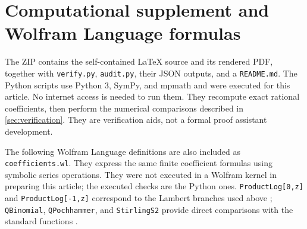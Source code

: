 \documentclass[11pt,a4paper]{article}
\theoremstyle{definition}
\theoremstyle{remark}
\numberwithin{equation}{section}
\begin{document}
\section{Computational supplement and Wolfram Language formulas}
\label{app:code}
The ZIP contains the self-contained \LaTeX{} source and its rendered PDF, together with \texttt{verify.py}, \texttt{audit.py}, their JSON outputs, and a \texttt{README.md}. The Python scripts use Python 3, SymPy, and mpmath and were executed for this article. No internet access is needed to run them. They recompute exact rational coefficients, then perform the numerical comparisons described in \cref{sec:verification}. They are verification aids, not a formal proof assistant development.

The following Wolfram Language definitions are also included as \texttt{coefficients.wl}. They express the same finite coefficient formulas using symbolic series operations. They were not executed in a Wolfram kernel in preparing this article; the executed checks are the Python ones. \texttt{ProductLog[0,z]} and \texttt{ProductLog[-1,z]} correspond to the Lambert branches used above \cite{wlproductlog}; \texttt{QBinomial}, \texttt{QPochhammer}, and \texttt{StirlingS2} provide direct comparisons with the standard functions \cite{wlqbinomial,wlqpochhammer,wlstirling}.
\end{document}
